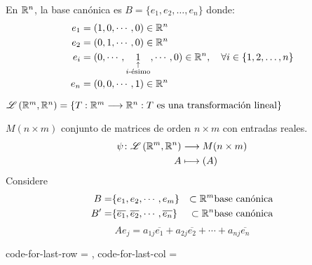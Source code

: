    En $\mathbb{R}^{n}$, la base canónica es $B = \{ e_1, e_2, \ldots, e_n \}$ donde:
   \[
   \begin{aligned}
   	e_1 &= (1,0,\cdots,0) \in \mathbb{R}^{n} \\
   	e_2 &= (0,1,\cdots,0) \in \mathbb{R}^{n} \\
   	e_i &= (0,\cdots, \underset{\substack{\uparrow \\ i\text{-ésimo}}}{1},\cdots,0) \in \mathbb{R}^{n}, \quad \forall i \in \{1,2,\ldots,n\} \\
   	e_n &= (0,0,\cdots,1) \in \mathbb{R}^{n}
   \end{aligned}
   \]
    
   
 $\mathscr{L}\left( \mathbb{R}^{m}, \mathbb{R}^{n} \right) = \{T: \mathbb{R}^{m} \longrightarrow \mathbb{R}^{n} : T 
 \text{ es una transformación lineal}\}$

 $M(n\times m)$  conjunto de matrices de orden $n\times m $ con entradas reales.
\begin{align*}
    \psi \colon \mathscr{L}\left( \mathbb{R}^{m}, \mathbb{R}^{n} \right) &\longrightarrow M(n\times m) \\
    A & \longmapsto (A)
\end{align*}
Considere \begin{align*} 
    B =& \{ e_1, e_2, \cdots, e_m\} &\subset \mathbb{R}^{m} \text{base canónica}\\
    B' =& \{ \overline{e_1} , \overline{e_2}, \cdots, \overline{e_n}\} &\subset \mathbb{R}^{n} \text{base canónica}\\
    \end{align*}
$$
Ae_j = a_{1j}\overline{e_1}+a_{2j}\overline{e_2}+\cdots+a_{nj}\overline{e_n}
$$

\NiceMatrixOptions%
 {code-for-last-row = \scriptstyle \rotate ,
 code-for-last-col = \scriptstyle }

